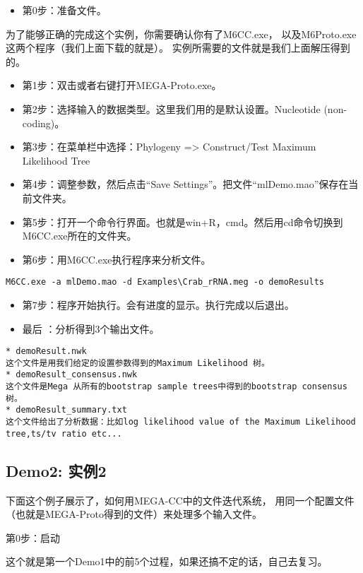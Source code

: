 \documentclass{ctexart}
\begin{document}
\begin{itemize}
\item 第0步：准备文件。
\end{itemize}
为了能够正确的完成这个实例，你需要确认你有了M6CC.exe，
以及M6Proto.exe这两个程序（我们上面下载的就是）。
实例所需要的文件就是我们上面解压得到的。
\begin{itemize}
\item 第1步：双击或者右键打开MEGA-Proto.exe。
\item 第2步：选择输入的数据类型。这里我们用的是默认设置。Nucleotide (non-coding)。
\item 第3步：在菜单栏中选择：Phylogeny => Construct/Test Maximum Likelihood Tree
\item 第4步：调整参数，然后点击“Save Settings”。把文件“mlDemo.mao”保存在当前文件夹。
\item 第5步：打开一个命令行界面。也就是win+R，cmd。然后用cd命令切换到M6CC.exe所在的文件夹。
\item 第6步：用M6CC.exe执行程序来分析文件。
\end{itemize}

\lstset{frame=trBL,frameround=fttt,breaklines=true,language=Perl}
\begin{lstlisting}
M6CC.exe -a mlDemo.mao -d Examples\Crab_rRNA.meg -o demoResults
\end{lstlisting}
\begin{itemize}
\item 第7步：程序开始执行。会有进度的显示。执行完成以后退出。
\item 最后 ：分析得到3个输出文件。
\end{itemize}

\begin{verbatim}
* demoResult.nwk
这个文件是用我们给定的设置参数得到的Maximum Likelihood 树。
* demoResult_consensus.nwk
这个文件是Mega 从所有的bootstrap sample trees中得到的bootstrap consensus树。
* demoResult_summary.txt
这个文件给出了分析数据：比如log likelihood value of the Maximum Likelihood tree,ts/tv ratio etc...
\end{verbatim}
\subsection{Demo2: 实例2}
\label{sec-3-7}

下面这个例子展示了，如何用MEGA-CC中的文件迭代系统，
用同一个配置文件（也就是MEGA-Proto得到的文件）来处理多个输入文件。

第0步：启动

这个就是第一个Demo1中的前5个过程，如果还搞不定的话，自己去复习。
\end{document}
